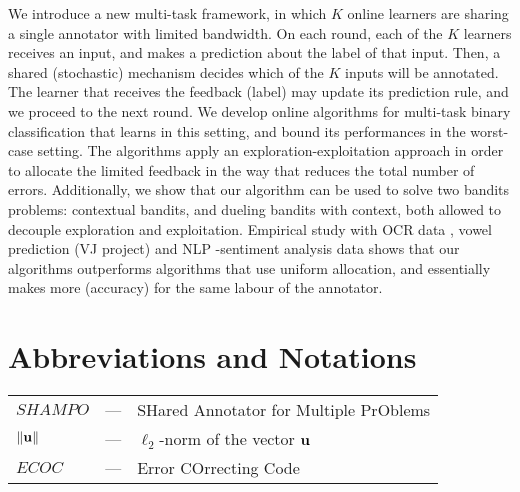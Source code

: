 \documentclass[MSc,beforeExam]{iitcsthesis}
\begin{document}






\maketitleEnglish

\abstractEnglish
We introduce a new multi-task framework, in which $K$ online
learners are sharing a single annotator with limited bandwidth. On
each round, each of the $K$ learners receives an input, and makes a
prediction about the label of that input. Then, a shared
(stochastic) mechanism decides which of the $K$ inputs will be
annotated. The learner that receives the feedback (label) may update
its prediction rule, and we proceed to the next round. We develop 
online algorithms for multi-task binary classification that learns in
this setting, and bound its performances in the worst-case
setting. The algorithms apply an exploration-exploitation approach in order to allocate the limited feedback in the way that reduces the total number of errors.  
Additionally, we show that our algorithm can be used to
solve two bandits problems: contextual bandits, and dueling bandits
with context, both allowed to decouple exploration and
exploitation. Empirical study with OCR data , vowel prediction (VJ
project) and NLP -sentiment analysis data shows that our algorithms outperforms algorithms that use
uniform allocation, and essentially makes more (accuracy) for the
same labour of the annotator.


\chapter*{Abbreviations and Notations}
\begin{tabular}{lcl}
$SHAMPO$ & --- & SHared Annotator for Multiple PrOblems\\
$\Vert\mathbf{u} \Vert$ & --- & $\ell_2$-norm of the vector $\mathbf{u}$\\
$ECOC$& --- & Error COrrecting Code
\end{tabular}
\end{document}
